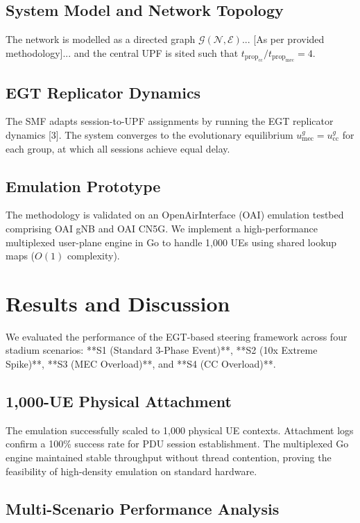 \documentclass[conference]{IEEEtran}
\begin{document}
\subsection{System Model and Network Topology}
The network is modelled as a directed graph $\mathcal{G}(\mathcal{N},\mathcal{E})$... [As per provided methodology]... and the central UPF is sited such that $t_{\text{prop}_\text{cc}} / t_{\text{prop}_\text{mec}} = 4$.

\subsection{EGT Replicator Dynamics}
The SMF adapts session-to-UPF assignments by running the EGT replicator dynamics [3]. The system converges to the evolutionary equilibrium $u_\text{mec}^g = u_\text{cc}^g$ for each group, at which all sessions achieve equal delay.

\subsection{Emulation Prototype}
The methodology is validated on an OpenAirInterface (OAI) emulation testbed comprising OAI gNB and OAI CN5G. We implement a high-performance multiplexed user-plane engine in Go to handle 1,000 UEs using shared lookup maps ($O(1)$ complexity). 

\section{Results and Discussion}

We evaluated the performance of the EGT-based steering framework across four stadium scenarios: **S1 (Standard 3-Phase Event)**, **S2 (10x Extreme Spike)**, **S3 (MEC Overload)**, and **S4 (CC Overload)**.

\subsection{1,000-UE Physical Attachment}
The emulation successfully scaled to 1,000 physical UE contexts. Attachment logs confirm a 100\% success rate for PDU session establishment. The multiplexed Go engine maintained stable throughput without thread contention, proving the feasibility of high-density emulation on standard hardware.

\subsection{Multi-Scenario Performance Analysis}
\end{document}
